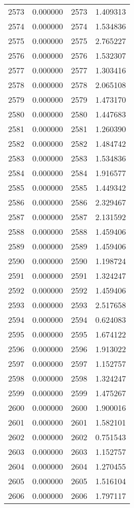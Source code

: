 \documentclass[12pt]{article}
\begin{document}
\begin{longtable}{@{}cccc@{}}
2573 & 0.000000 & 2573 & 1.409313 \\
2574 & 0.000000 & 2574 & 1.534836 \\
2575 & 0.000000 & 2575 & 2.765227 \\
2576 & 0.000000 & 2576 & 1.532307 \\
2577 & 0.000000 & 2577 & 1.303416 \\
2578 & 0.000000 & 2578 & 2.065108 \\
2579 & 0.000000 & 2579 & 1.473170 \\
2580 & 0.000000 & 2580 & 1.447683 \\
2581 & 0.000000 & 2581 & 1.260390 \\
2582 & 0.000000 & 2582 & 1.484742 \\
2583 & 0.000000 & 2583 & 1.534836 \\
2584 & 0.000000 & 2584 & 1.916577 \\
2585 & 0.000000 & 2585 & 1.449342 \\
2586 & 0.000000 & 2586 & 2.329467 \\
2587 & 0.000000 & 2587 & 2.131592 \\
2588 & 0.000000 & 2588 & 1.459406 \\
2589 & 0.000000 & 2589 & 1.459406 \\
2590 & 0.000000 & 2590 & 1.198724 \\
2591 & 0.000000 & 2591 & 1.324247 \\
2592 & 0.000000 & 2592 & 1.459406 \\
2593 & 0.000000 & 2593 & 2.517658 \\
2594 & 0.000000 & 2594 & 0.624083 \\
2595 & 0.000000 & 2595 & 1.674122 \\
2596 & 0.000000 & 2596 & 1.913022 \\
2597 & 0.000000 & 2597 & 1.152757 \\
2598 & 0.000000 & 2598 & 1.324247 \\
2599 & 0.000000 & 2599 & 1.475267 \\
2600 & 0.000000 & 2600 & 1.900016 \\
2601 & 0.000000 & 2601 & 1.582101 \\
2602 & 0.000000 & 2602 & 0.751543 \\
2603 & 0.000000 & 2603 & 1.152757 \\
2604 & 0.000000 & 2604 & 1.270455 \\
2605 & 0.000000 & 2605 & 1.516104 \\
2606 & 0.000000 & 2606 & 1.797117 \\

\end{longtable}
\end{document}
